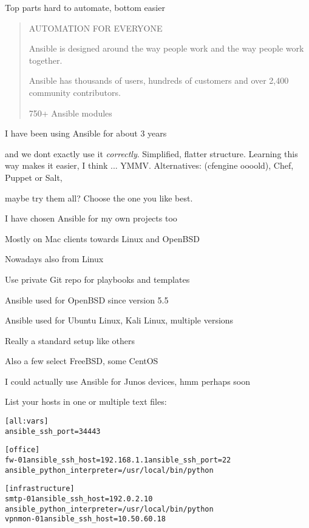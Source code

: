 \documentclass[18pt,landscape,a4paper,footrule]{foils}
\begin{document}
\vskip 5mm
\centerline{Top parts hard to automate, bottom easier \smiley}




\begin{quote}\small
AUTOMATION FOR EVERYONE

Ansible is designed around the way people work and the way people work together.

Ansible has thousands of users, hundreds of customers and over 2,400 community contributors.

750+ Ansible modules
\end{quote}


\centerline{I have been using Ansible for about 3 years}

and we dont exactly use it \emph{correctly}. Simplified, flatter structure.  Learning this way makes it easier, I think ... YMMV.
\vskip 2cm
Alternatives: (cfengine oooold), Chef, Puppet or Salt,

maybe try them all? Choose the one you like best.

\vskip 1cm
\centerline{I have chosen Ansible for my own projects too}


\begin{list2}
\item Mostly on Mac clients towards Linux and OpenBSD
\item Nowadays also from Linux
\item Use private Git repo for playbooks and templates
\item Ansible used for OpenBSD since version 5.5
\item Ansible used for Ubuntu Linux, Kali Linux, multiple versions
\item Really a standard setup like others
\item Also a few select FreeBSD, some CentOS
\item I could actually use Ansible for Junos devices, hmm perhaps soon \smiley
\end{list2}



List your hosts in one or multiple text files:
\begin{alltt}\footnotesize
[all:vars]
ansible_ssh_port=34443

[office]
fw-01 ansible_ssh_host=192.168.1.1 ansible_ssh_port=22
ansible_python_interpreter=/usr/local/bin/python

[infrastructure]
smtp-01     ansible_ssh_host=192.0.2.10
ansible_python_interpreter=/usr/local/bin/python
vpnmon-01   ansible_ssh_host=10.50.60.18

\end{alltt}
\end{document}
